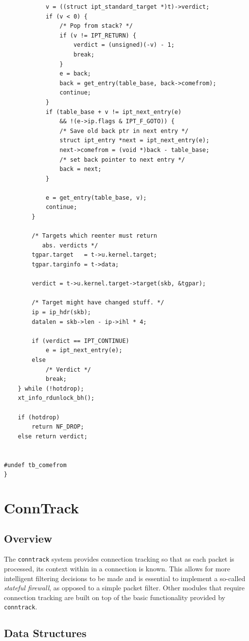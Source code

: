 \documentclass[a4paper,10pt]{article}
\begin{document}
\begin{lstlisting}
			v = ((struct ipt_standard_target *)t)->verdict;
			if (v < 0) {
				/* Pop from stack? */
				if (v != IPT_RETURN) {
					verdict = (unsigned)(-v) - 1;
					break;
				}
				e = back;
				back = get_entry(table_base, back->comefrom);
				continue;
			}
			if (table_base + v != ipt_next_entry(e)
			    && !(e->ip.flags & IPT_F_GOTO)) {
				/* Save old back ptr in next entry */
				struct ipt_entry *next = ipt_next_entry(e);
				next->comefrom = (void *)back - table_base;
				/* set back pointer to next entry */
				back = next;
			}

			e = get_entry(table_base, v);
			continue;
		}

		/* Targets which reenter must return
		   abs. verdicts */
		tgpar.target   = t->u.kernel.target;
		tgpar.targinfo = t->data;

		verdict = t->u.kernel.target->target(skb, &tgpar);

		/* Target might have changed stuff. */
		ip = ip_hdr(skb);
		datalen = skb->len - ip->ihl * 4;

		if (verdict == IPT_CONTINUE)
			e = ipt_next_entry(e);
		else
			/* Verdict */
			break;
	} while (!hotdrop);
	xt_info_rdunlock_bh();

	if (hotdrop)
		return NF_DROP;
	else return verdict;


#undef tb_comefrom
}
\end{lstlisting}
\lstset{stepnumber=0}

\section{ConnTrack}\label{conntrack}

\subsection{Overview}
The \verb|conntrack| system provides connection tracking so that as each packet is processed, its context within in a connection is known. This allows for more intelligent filtering decisions to be made and is essential to implement a so-called \textit{stateful firewall}, as opposed to a simple packet filter. Other modules that require connection tracking are built on top of the basic functionality provided by \verb|conntrack|.

\subsection{Data Structures}
\end{document}
